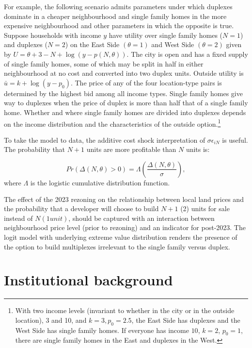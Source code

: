 \documentclass[12pt]{article}
\begin{document}
For example, the following scenario admits parameters under which duplexes
dominate in a cheaper neighbourhood and single family homes in the more
expensive neighbourhood and other parameters in which the opposite is true.
Suppose households with income $y$ have utility over single family homes
($N=1$) and duplexes ($N=2$) on the East Side $(\theta=1)$ and West Side
$(\theta=2)$ given by $U = \theta + 3 - N + \log(y-p(N,\theta))$. The city is
open and has a fixed supply of single family homes, some of which may be split
in half in either neighbourhood at no cost and converted into two duplex units.
Outside utility is $\bar{u} = k+\log(y-p_{0})$. The price of any of the four
location-type pairs is determined by the highest bid among all income types.
Single family homes give way to duplexes when the price of duplex is more than
half that of a single family home. Whether and where single family homes are
divided into duplexes depends on the income distribution and the
characteristics of the outside option.\footnote{With two income levels
	(invariant to whether in the city or in the outside location), 3 and
	10, and $k=3, p_{0}=2.5$, the East Side has duplexes and the West Side
	has single family homes. If everyone has income $10$, $k=2$, $p_{0}=1$,
there are single family homes in the East and duplexes in the West.}

To take the model to data, the additive cost shock interpretation of
$\sigma\epsilon_{iN}$ is useful. The probability that $N+1$ units are more
profitable than $N$ units is:

\begin{equation}
	Pr(\Delta(N,\theta) > 0) = \Lambda\left(\frac{\Delta(N,\theta)}{\sigma}\right),
\end{equation}
where $\Lambda$ is the logistic cumulative distribution function. 

The effect of the 2023 rezoning on the relationship between local land prices and the probability that a developer will choose to build $N+1$ (2) units for sale instead of $N (1 unit)$, should be captured with an interaction between neighbourhood price level (prior to rezoning) and an indicator for post-2023. The logit model with underlying extreme value distribution renders the presence of the option to build multiplexes irrelevant to the single family versus duplex.

\section{\label{sec:policies} Institutional background}
\end{document}
